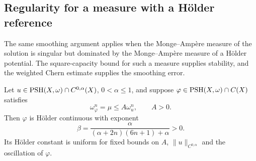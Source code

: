 \subsection{Regularity for a measure with a H\"older reference}

The same smoothing argument applies when the Monge--Amp\`ere measure of the solution is singular but dominated by the Monge--Amp\`ere measure of a H\"older potential. The square-capacity bound for such a measure supplies stability, and the weighted Chern estimate supplies the smoothing error.

\begin{theorem}\label{thm:holder-dominated-continuous-regularity}
Let $u\in\mathrm{PSH}(X,\omega)\cap C^{0,\alpha}(X)$, $0<\alpha\leq1$, and suppose $\varphi\in\mathrm{PSH}(X,\omega)\cap C(X)$ satisfies
\[
 \omega_\varphi^n=\mu\leq A\omega_u^n,
 \qquad A>0.
\]
Then $\varphi$ is H\"older continuous with exponent
\[
 \beta=\frac{\alpha}{(\alpha+2n)(6n+1)+\alpha}>0.
\]
Its H\"older constant is uniform for fixed bounds on $A$, $\|u\|_{C^{0,\alpha}}$ and the oscillation of $\varphi$.
\end{theorem}
